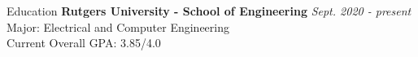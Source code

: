 \documentclass{resume}
\begin{document}

    \begin{rSection}{Education}
        {\bf Rutgers University - School of Engineering} \hfill {\em Sept. 2020 - present} \\
        Major: Electrical and Computer Engineering \\
        Current Overall GPA: 3.85/4.0

    \end{rSection}

\end{document}
